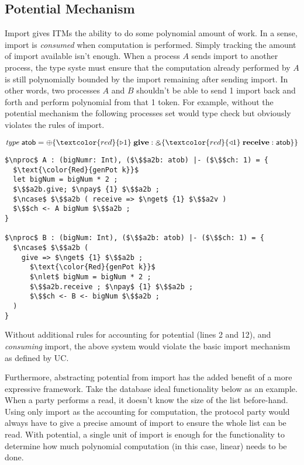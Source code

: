 \subsection{Potential Mechanism}
Import gives ITMs the ability to do some polynomial amount of work. In a sense, 
import is \emph{consumed} when computation is performed. Simply tracking the amount of import 
available isn't enough. When a process $A$ sends import to another process, the type syste must ensure
that the computation already performed by $A$ is still polynomially bounded by the import remaining after sending import.
In other words, two processes $A$ and $B$ shouldn't be able to send 1 import back and forth and perform polynomial from that 1 token. For example, without the potential mechanism the following processes set would type check but obviously violates the rules of import. 

\begin{tabbing}
	$\mi{type} \; \m{atob} = \ichoice{\textcolor{red}{\paypot{1}} \; \mb{give}: \echoice{\textcolor{red}{\getpot{1}} \; \mb{receive}: \m{atob}}}$
\end{tabbing}

\begin{lstlisting}[basicstyle=\footnotesize\BeraMonottFamily, mathescape, frame=single]
$\nproc$ A : (bigNumr: Int), ($\$$a2b: atob) |- ($\$$ch: 1) = {
  $\text{\color{Red}{genPot k}}$
  let bigNum = bigNum * 2 ;
  $\$$a2b.give; $\npay$ {1} $\$$a2b ;
  $\ncase$ $\$$a2b ( receive => $\nget$ {1} $\$$a2v )
  $\$$ch <- A bigNum $\$$a2b ;
}

$\nproc$ B : (bigNum: Int), ($\$$a2b: atob) |- ($\$$ch: 1) = {
  $\ncase$ $\$$a2b (
    give => $\nget$ {1} $\$$a2b ;
      $\text{\color{Red}{genPot k}}$
      $\nlet$ bigNum = bigNum * 2 ;
      $\$$a2b.receive ; $\npay$ {1} $\$$a2b ;
      $\$$ch <- B <- bigNum $\$$a2b ;
  )
}
\end{lstlisting}

Without additional rules for accounting for potential (lines 2 and 12), and \emph{consuming} import, the above system would violate the basic import mechanism as defined by UC.

Furthermore, abstracting potential from import has the added benefit of a more expressive framework.
Take the database ideal functionality below as an example. 
When a party performs a read, it doesn't know the size of the list before-hand. 
Using only import as the accounting for computation, the protocol party would always have to give a precise amount of import to ensure the whole list can be read. 
With potential, a single unit of import is enough for the functionality to determine how much polynomial computation (in this case, linear) needs to be done.  

